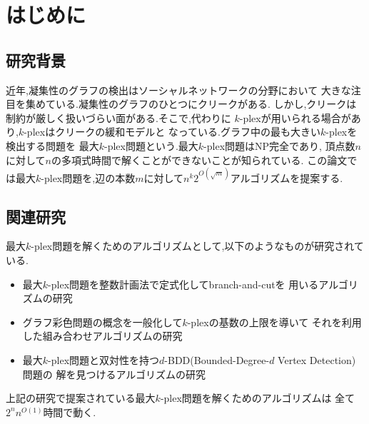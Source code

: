 \documentclass{thesis}
\theoremstyle{definition}
\begin{document}
\baselineskip=22pt
\pagestyle{empty}

\maketitle

\pagestyle{myheadings}	%
\tableofcontents

\newpage


\chapter{はじめに}

\section{研究背景}
近年,凝集性のグラフの検出はソーシャルネットワークの分野において
大きな注目を集めている.凝集性のグラフのひとつにクリークがある.
しかし,クリークは制約が厳しく扱いづらい面がある.そこで,代わりに
$k$-plexが用いられる場合があり,$k$-plexはクリークの緩和モデルと
なっている.グラフ中の最も大きい$k$-plexを検出する問題を
最大$k$-plex問題という.最大$k$-plex問題はNP完全であり,
頂点数$n$に対して$n$の多項式時間で解くことができないことが知られている.
この論文では最大$k$-plex問題を,辺の本数$m$に対して$n^{k }2^{O(\sqrt{m})}$アルゴリズムを提案する.

\section{関連研究}
最大$k$-plex問題を解くためのアルゴリズムとして,以下のようなものが研究されている.
\begin{itemize}
 \item 最大$k$-plex問題を整数計画法で定式化してbranch-and-cutを
	用いるアルゴリズムの研究 \cite{balasundaram2011clique}
 \item グラフ彩色問題の概念を一般化して$k$-plexの基数の上限を導いて
	それを利用した組み合わせアルゴリズムの研究 \cite{mcclosky2012combinatorial}
 \item 最大$k$-plex問題と双対性を持つ$d$-BDD(Bounded-Degree-$d$ Vertex Detection)問題の
	解を見つけるアルゴリズムの研究 \cite{moser2012exact}
\end{itemize}
上記の研究で提案されている最大$k$-plex問題を解くためのアルゴリズムは
全て$2^{n}n^{O(1)}$時間で動く.
\end{document}
